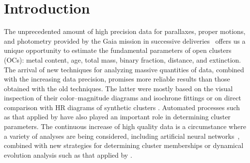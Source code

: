 \documentclass{aa}
\begin{document}
\maketitle


\section{Introduction}

 The unprecedented amount of high precision data for parallaxes, proper motions,
 and photometry provided by the Gaia mission in successive
 deliveries~\citep[DR2 and EDR3,][]{Gaia_2016,Gaia_EDR3} offers us a unique
 opportunity to estimate the fundamental parameters of open clusters (OCs): metal
 content, age, total mass, binary fraction, distance,  and extinction.
 The arrival of new techniques for analyzing massive quantities of  data, combined with the
 increasing data precision, promises more reliable results than those obtained
 with the old techniques. The latter were mostly based on the visual inspection
 of their color--magnitude diagrams and isochrone fittings \citep{Phelps1994} or
 on direct comparison with HR diagrams of synthetic clusters \citep{Siess1997}.
 Automated processes such as that applied by \cite{Kharchenko_2012} have also
 played an important role in determining cluster parameters.
 The continuous increase of high quality data is a  circumstance
 where a variety of analyses are being considered, including artificial
 neural networks~\citep{Cantat_2020}, combined with new strategies for
 determining cluster memberships \citep{Krone2014,Cantat-Gaudin_2018} or
 dynamical
 evolution analysis such as that applied by \citep{Gregorio_2015}.
\end{document}
